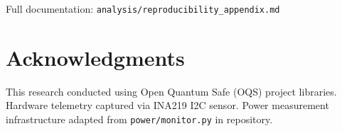 \documentclass[11pt,a4paper]{article}
\begin{document}
Full documentation: \texttt{analysis/reproducibility\_appendix.md}

\section*{Acknowledgments}

This research conducted using Open Quantum Safe (OQS) project libraries. Hardware telemetry captured via INA219 I2C sensor. Power measurement infrastructure adapted from \texttt{power/monitor.py} in repository.
\end{document}
